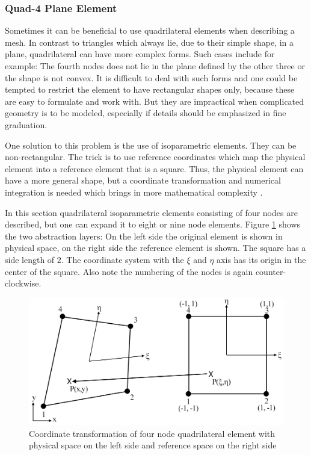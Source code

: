   
  
  \subsubsection{Quad-4 Plane Element}\label{sec:Shell-Plane-Quad}
  Sometimes it can be beneficial to use quadrilateral elements when describing a mesh. In contrast to triangles which always lie, due to their simple shape, in a plane, quadrilateral can have more complex forms. Such cases include for example: The fourth nodes does not lie in the plane defined by the other three or the shape is not convex. It is difficult to deal with such forms and one could be tempted to restrict the element to have rectangular shapes only, because these are easy to formulate and work with. But they are impractical when complicated geometry is to be modeled, especially if details should be emphasized in fine graduation.
    
  One solution to this problem is the use of isoparametric elements. They can be non-rectangular. The trick is to use reference coordinates which map the physical element into a reference element that is a square. Thus, the physical element can have a more general shape, but a coordinate transformation and numerical integration is needed which brings in more mathematical complexity \cite{cook2002concepts}.
  
  In this section quadrilateral isoparametric elements consisting of four nodes are described, but one can expand it to eight or nine node elements. Figure \ref{fig:coord_trafo} shows the two abstraction layers: On the left side the original element is shown in physical space, on the right side the reference element is shown. The square has a side length of $2$. The coordinate system with the $\xi$ and $\eta$ axis has its origin in the center of the square. Also note the numbering of the nodes is again counter-clockwise.
  \begin{figure}[htbp]%
  	\centering
  	\includegraphics[width=0.97\linewidth]{figures/coord_trafo}
  	\caption{Coordinate transformation of four node quadrilateral element with physical space on the left side and reference space on the right side}
  	\label{fig:coord_trafo}
  \end{figure}
  
